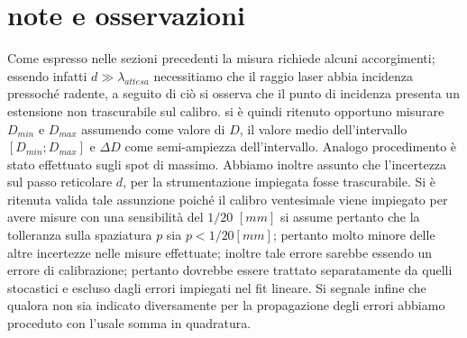 \section{note e osservazioni}
Come espresso nelle sezioni precedenti la misura richiede alcuni accorgimenti;
essendo infatti  $d\gg \lambda_{attesa}$ necessitiamo che il raggio laser abbia
incidenza  pressoché radente,
a seguito di ciò si osserva che il
punto di incidenza 
presenta un estensione non trascurabile sul calibro.
si è quindi ritenuto opportuno misurare $D_{min}$ e $ D_{max}$
assumendo come valore di $D $, il valore medio 
dell'intervallo $[D_{min};D_{max}]$  e $\Delta D$
come semi-ampiezza dell'intervallo.
Analogo procedimento è stato effettuato sugli spot
di massimo.
Abbiamo inoltre assunto che l'incertezza sul passo
reticolare $d$, per la strumentazione impiegata 
fosse trascurabile. Si è ritenuta valida tale assunzione poiché il 
calibro ventesimale viene impiegato per avere misure con una sensibilità del
$1/20$ $[mm]$ si assume pertanto che la tolleranza sulla spaziatura
$p$ sia $p<1/20[mm]$; pertanto molto minore delle altre incertezze  nelle
misure effettuate;
inoltre tale errore sarebbe essendo un errore di calibrazione;
pertanto dovrebbe essere trattato separatamente da quelli stocastici e 
escluso dagli errori impiegati nel fit lineare. 
Si segnale infine che qualora non sia indicato diversamente per la propagazione degli errori
abbiamo proceduto con l'usale somma in quadratura.